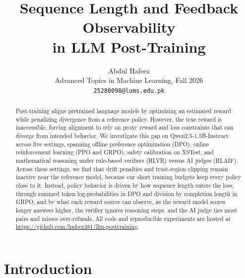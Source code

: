\documentclass{article}
\title{Sequence Length and Feedback Observability\\in LLM Post-Training}
\author{%
  Abdul Hafeez \\
  Advanced Topics in Machine Learning, Fall 2026\\
  \texttt{25280098@lums.edu.pk}
}
\begin{document}
\maketitle

\begin{abstract}
Post-training aligns pretrained language models by optimizing an estimated reward while penalizing divergence from a reference policy. However, the true reward is inaccessible, forcing alignment to rely on proxy reward and loss constraints that can diverge from intended behavior. We investigate this gap on Qwen2.5-1.5B-Instruct across five settings, spanning offline preference optimization (DPO), online reinforcement learning (PPO and GRPO), safety calibration on XSTest, and mathematical reasoning under rule-based verifiers (RLVR) versus AI judges (RLAIF). Across these settings, we find that drift penalties and trust-region clipping remain inactive near the reference model, because our short training budgets keep every policy close to it. Instead, policy behavior is driven by how sequence length enters the loss, through summed token log-probabilities in DPO and division by completion length in GRPO, and by what each reward source can observe, as the reward model scores longer answers higher, the verifier ignores reasoning steps, and the AI judge ties most pairs and misses over-refusals. All code and reproducible experiments are hosted at \url{https://github.com/hafeez381/llm-posttraining}.
\end{abstract}


\section{Introduction}
\label{sec:intro}
\end{document}
